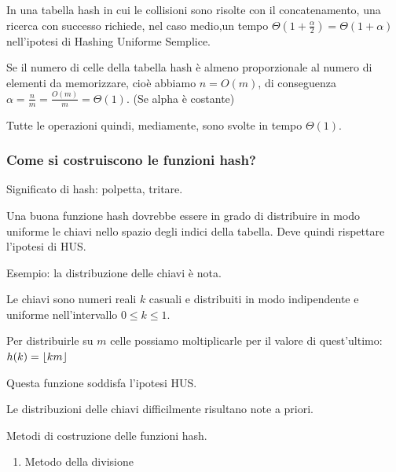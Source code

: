 \documentclass{article}
\DeclarePairedDelimiter\floor{\lfloor}{\rfloor}
\providecommand{\tightlist}{%
  \setlength{\itemsep}{0pt}\setlength{\parskip}{0pt}}
\begin{document}
{{In una tabella hash in cui le collisioni sono risolte con il concatenamento, una ricerca con successo richiede, nel caso medio,un tempo $\Theta(1+\frac{\alpha}{2}) = \Theta(1+\alpha)$ nell'ipotesi di Hashing Uniforme Semplice.}

{}

{Se il numero di celle della tabella hash è almeno proporzionale al numero di elementi da memorizzare, cioè abbiamo $n=O(m)$, di conseguenza \\ $\alpha=\frac{n}{m} = \frac{O(m)}{m}=\Theta(1)$. (Se alpha è costante) }

Tutte le operazioni quindi, mediamente, sono svolte in tempo $\Theta(1)$.

{}

\hypertarget{h.9kljpwmnt7yd}{\subsubsection{\texorpdfstring{{Come si
costruiscono le funzioni
hash?}}{Come si costruiscono le funzioni hash?}}\label{h.9kljpwmnt7yd}}

{Significato di hash: polpetta, tritare.}

{}

{Una buona funzione hash dovrebbe essere in grado di distribuire in modo
uniforme le chiavi nello spazio degli indici della tabella. Deve quindi
rispettare l'ipotesi di HUS.}

{}

{Esempio: la distribuzione delle chiavi è nota.}

{Le chiavi sono numeri reali $k$ casuali e distribuiti in modo indipendente e uniforme nell'intervallo $0 \leq k \leq 1$.}

{Per distribuirle su $m$ celle possiamo moltiplicarle per il valore di quest'ultimo: $h(k) = \floor{km}$}

{Questa funzione soddisfa l'ipotesi HUS.}

{}

{Le distribuzioni delle chiavi difficilmente risultano note a priori. }

{}

{Metodi di costruzione delle funzioni hash.}

{}

\begin{enumerate}
\tightlist
\item
  {Metodo della divisione}
\end{enumerate}

{}

}
\end{document}
